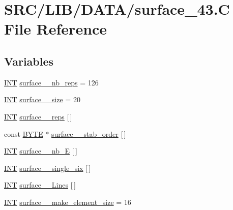 \hypertarget{surface__43_8_c}{}\section{S\+R\+C/\+L\+I\+B/\+D\+A\+T\+A/surface\+\_\+43.C File Reference}
\label{surface__43_8_c}
\subsection*{Variables}
\begin{DoxyCompactItemize}
\item 
\mbox{\hyperlink{galois_8h_a09fddde158a3a20bd2dcadb609de11dc}{I\+NT}} \mbox{\hyperlink{surface__43_8_c_ab7892b26022abba64ac6272b5f8b336b}{surface\+\_\+\_\+nb\+\_\+reps}} = 126
\item 
\mbox{\hyperlink{galois_8h_a09fddde158a3a20bd2dcadb609de11dc}{I\+NT}} \mbox{\hyperlink{surface__43_8_c_a4aa8ae11789e085feca36d45abbccebf}{surface\+\_\+\_\+size}} = 20
\item 
\mbox{\hyperlink{galois_8h_a09fddde158a3a20bd2dcadb609de11dc}{I\+NT}} \mbox{\hyperlink{surface__43_8_c_acc8e5684244cdeef3a735847495f7c7b}{surface\+\_\+\_\+reps}} \mbox{[}$\,$\mbox{]}
\item 
const \mbox{\hyperlink{galois_8h_ab6cc7b4aeb6ea31aba2b3fbfc83ff5e6}{B\+Y\+TE}} $\ast$ \mbox{\hyperlink{surface__43_8_c_a161d9c7ac6cb3956fcd8392ded70c45c}{surface\+\_\+\_\+stab\+\_\+order}} \mbox{[}$\,$\mbox{]}
\item 
\mbox{\hyperlink{galois_8h_a09fddde158a3a20bd2dcadb609de11dc}{I\+NT}} \mbox{\hyperlink{surface__43_8_c_a3ece97e074bfcac69d6c71dc9bd086aa}{surface\+\_\+\_\+nb\+\_\+E}} \mbox{[}$\,$\mbox{]}
\item 
\mbox{\hyperlink{galois_8h_a09fddde158a3a20bd2dcadb609de11dc}{I\+NT}} \mbox{\hyperlink{surface__43_8_c_a39f7858d4b5437584fa8a55083280932}{surface\+\_\+\_\+single\+\_\+six}} \mbox{[}$\,$\mbox{]}
\item 
\mbox{\hyperlink{galois_8h_a09fddde158a3a20bd2dcadb609de11dc}{I\+NT}} \mbox{\hyperlink{surface__43_8_c_a0567b06c8eb62f6c93fd598d65bba57e}{surface\+\_\+\_\+\+Lines}} \mbox{[}$\,$\mbox{]}
\item 
\mbox{\hyperlink{galois_8h_a09fddde158a3a20bd2dcadb609de11dc}{I\+NT}} \mbox{\hyperlink{surface__43_8_c_ac1194c7fae06f6d16d0e1a16b84cad7a}{surface\+\_\+\_\+make\+\_\+element\+\_\+size}} = 16
\item 

\end{DoxyCompactItemize}
